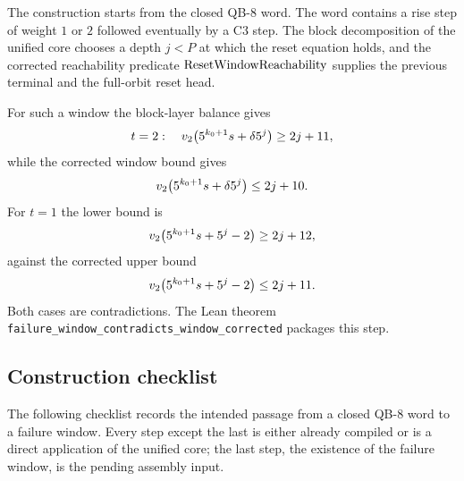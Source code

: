 The construction starts from the closed QB-8 word.  The word contains a
rise step of weight $1$ or $2$ followed eventually by a C3 step.  The
block decomposition of the unified core chooses a depth $j<P$ at which
the reset equation holds, and the corrected reachability predicate
$\mathrm{ResetWindowReachability}$ supplies the previous terminal and the full-orbit reset
head.

For such a window the block-layer balance gives
\begin{equation*}
  t=2:\quad v_2\!\left(5^{k_0+1}s+\delta5^j\right)\ge 2j+11,
\end{equation*}
while the corrected window bound gives
\begin{equation*}
  v_2\!\left(5^{k_0+1}s+\delta5^j\right)\le 2j+10.
\end{equation*}
For $t=1$ the lower bound is
\begin{equation*}
  v_2\!\left(5^{k_0+1}s+5^j-2\right)\ge 2j+12,
\end{equation*}
against the corrected upper bound
\begin{equation*}
  v_2\!\left(5^{k_0+1}s+5^j-2\right)\le 2j+11.
\end{equation*}
Both cases are contradictions.  The Lean theorem
\texttt{failure\_window\_\allowbreak contradicts\_window\_corrected}
packages this step.

\subsection{Construction checklist}

The following checklist records the intended passage from a closed
QB-8 word to a failure window.  Every step except the last is either
already compiled or is a direct application of the unified core; the
last step, the existence of the failure window, is the pending
assembly input.

